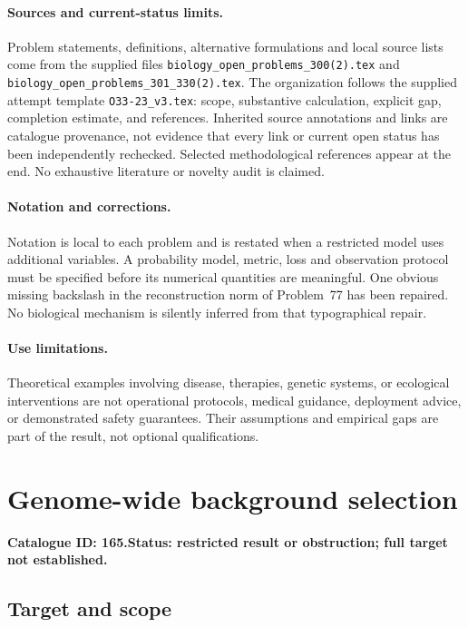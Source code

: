\documentclass[11pt]{article}
\begin{document}
\paragraph{Sources and current-status limits.}
Problem statements, definitions, alternative formulations and local source lists
come from the supplied files
\texttt{biology\_open\_problems\_300(2).tex} and
\texttt{biology\_open\_problems\_301\_330(2).tex}.
The organization follows the supplied attempt template
\texttt{O33-23\_v3.tex}: scope, substantive calculation, explicit gap,
completion estimate, and references. Inherited source annotations and links are
catalogue provenance, not evidence that every link or current open status has
been independently rechecked. Selected methodological references appear at the
end. No exhaustive literature or novelty audit is claimed.

\paragraph{Notation and corrections.}
Notation is local to each problem and is restated when a restricted model uses
additional variables. A probability model, metric, loss and observation protocol
must be specified before its numerical quantities are meaningful. One obvious
missing backslash in the reconstruction norm of Problem~77 has been repaired.
No biological mechanism is silently inferred from that typographical repair.

\paragraph{Use limitations.}
Theoretical examples involving disease, therapies, genetic systems, or ecological
interventions are not operational protocols, medical guidance, deployment advice,
or demonstrated safety guarantees. Their assumptions and empirical gaps are part
of the result, not optional qualifications.

\setcounter{section}{164}
\section{Genome-wide background selection}
\label{prob:165}
\noindent\textbf{Catalogue ID: 165.}\quad \textbf{Status: restricted result or obstruction; full target not established.}
\subsection{Target and scope}
\end{document}
